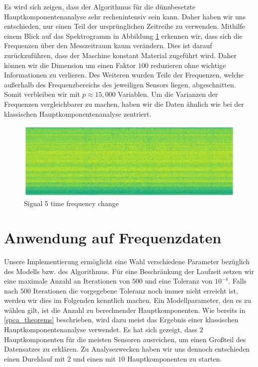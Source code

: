Es wird sich zeigen, dass der Algorithmus für die dünnbesetzte Hauptkomponentenanalyse sehr rechenintensiv sein kann. Daher haben wir uns entschieden, nur einen Teil der ursprünglichen Zeitreihe zu verwenden. Mithilfe einem Blick auf das Spektrogramm in Abbildung \ref{spectrogram} erkennen wir, dass sich die Frequenzen über den Messzeitraum kaum verändern. Dies ist darauf zurückzuführen, dass der Maschine konstant Material zugeführt wird. Daher können wir die Dimension um einen Faktor $100$ reduzieren ohne wichtige Informationen zu verlieren. Des Weiteren wurden Teile der Frequenzen, welche außerhalb des Frequenzbereichs des jeweiligen Sensors liegen, abgeschnitten. Somit verbleiben wir mit $p \approx 15,000$ Variablen. Um die Varianzen der Frequenzen vergleichbarer zu machen, haben wir die Daten ähnlich wie bei der klassischen Hauptkomponentenanalyse zentriert.

\begin{figure}
\centering
\includegraphics[width=\textwidth]{figures/Signal_5_time_frequency_change.png}
\caption{Signal 5 time frequency change}
\label{spectrogram}
\end{figure}



\section{Anwendung auf Frequenzdaten}
\label{application_frequency_data}

Unsere Implementierung ermöglicht eine Wahl verschiedene Parameter bezüglich des Modells bzw. des Algorithmus. Für eine Beschränkung der Laufzeit setzen wir eine maximale Anzahl an Iterationen von $500$ und eine Toleranz von $10^{-4}$. Falls nach $500$ Iterationen die vorgegebene Toleranz noch immer nicht erreicht ist, werden wir dies im Folgenden kenntlich machen. Ein Modellparameter, den es zu wählen gilt, ist die Anzahl zu berechnender Hauptkomponenten. Wie bereits in \ref{spca_theorems} beschrieben, wird dazu meist das Ergebnis einer klassischen Hauptkomponentenanalyse verwendet. Es hat sich gezeigt, dass $2$ Hauptkomponenten für die meisten Sensoren ausreichen, um einen Großteil des Datensatzes zu erklären. Zu Analysezwecken haben wir uns dennoch entschieden einen Durchlauf mit $2$ und einen mit $10$ Hauptkomponenten zu starten. 

